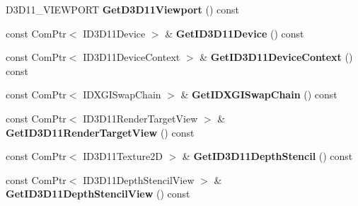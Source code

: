 \begin{DoxyCompactItemize}
\item 
\hypertarget{class_jade_1_1_graphics_1_1_d_x_device_aa3125ed2e7a78054a4a1c2b1dd940c07}{}D3\+D11\+\_\+\+V\+I\+E\+W\+P\+O\+R\+T {\bfseries Get\+D3\+D11\+Viewport} () const \label{class_jade_1_1_graphics_1_1_d_x_device_aa3125ed2e7a78054a4a1c2b1dd940c07}

\item 
\hypertarget{class_jade_1_1_graphics_1_1_d_x_device_a93034c862df624df4bd5d4d43739484f}{}const Com\+Ptr$<$ I\+D3\+D11\+Device $>$ \& {\bfseries Get\+I\+D3\+D11\+Device} () const \label{class_jade_1_1_graphics_1_1_d_x_device_a93034c862df624df4bd5d4d43739484f}

\item 
\hypertarget{class_jade_1_1_graphics_1_1_d_x_device_abc53796dbbf1c43414e6f430eeb505d6}{}const Com\+Ptr$<$ I\+D3\+D11\+Device\+Context $>$ \& {\bfseries Get\+I\+D3\+D11\+Device\+Context} () const \label{class_jade_1_1_graphics_1_1_d_x_device_abc53796dbbf1c43414e6f430eeb505d6}

\item 
\hypertarget{class_jade_1_1_graphics_1_1_d_x_device_a1b7881f30cca027fded3e615ac1beaea}{}const Com\+Ptr$<$ I\+D\+X\+G\+I\+Swap\+Chain $>$ \& {\bfseries Get\+I\+D\+X\+G\+I\+Swap\+Chain} () const \label{class_jade_1_1_graphics_1_1_d_x_device_a1b7881f30cca027fded3e615ac1beaea}

\item 
\hypertarget{class_jade_1_1_graphics_1_1_d_x_device_ad5a661a79d3ae471289df4c2307dc3e9}{}const Com\+Ptr$<$ I\+D3\+D11\+Render\+Target\+View $>$ \& {\bfseries Get\+I\+D3\+D11\+Render\+Target\+View} () const \label{class_jade_1_1_graphics_1_1_d_x_device_ad5a661a79d3ae471289df4c2307dc3e9}

\item 
\hypertarget{class_jade_1_1_graphics_1_1_d_x_device_a57e9b08a324df77e26feb5d9ad54a772}{}const Com\+Ptr$<$ I\+D3\+D11\+Texture2\+D $>$ \& {\bfseries Get\+I\+D3\+D11\+Depth\+Stencil} () const \label{class_jade_1_1_graphics_1_1_d_x_device_a57e9b08a324df77e26feb5d9ad54a772}

\item 
\hypertarget{class_jade_1_1_graphics_1_1_d_x_device_a603db8b80c1427741e1bb0682e8581ab}{}const Com\+Ptr$<$ I\+D3\+D11\+Depth\+Stencil\+View $>$ \& {\bfseries Get\+I\+D3\+D11\+Depth\+Stencil\+View} () const \label{class_jade_1_1_graphics_1_1_d_x_device_a603db8b80c1427741e1bb0682e8581ab}

\end{DoxyCompactItemize}

